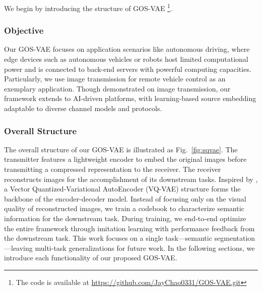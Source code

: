 
%
We begin by introducing the structure of GOS-VAE \footnote{The code is available at \url{https://github.com/JayChao0331/GOS-VAE.git}}.


\subsubsection{Objective}
Our GOS-VAE focuses on application scenarios like autonomous driving, where edge devices such as autonomous vehicles or robots host limited computational power and is connected
to back-end servers with powerful computing capacities. Particularly, we use image transmission for remote vehicle control as an exemplary application. Though demonstrated on image transmission, our framework extends to AI-driven platforms, with learning-based source embedding adaptable to diverse channel models and protocols.

\subsubsection{Overall Structure}
The overall structure of our GOS-VAE is illustrated as Fig.~\ref{fig:sqvae}.
The transmitter features a lightweight encoder to embed the original images before transmitting a compressed representation to the receiver. The receiver reconstructs images for the accomplishment of its downstream tasks. Inspired by \cite{fu2023vector}, a Vector Quantized-Variational AutoEncoder (VQ-VAE) \cite{van2017neural} structure forms the backbone of the encoder-decoder model. Instead of focusing only on the visual quality of reconstructed images, we train a codebook to characterize
semantic information for the downstream task. During training, we end-to-end optimize the entire framework through imitation learning with performance feedback from the downstream task. %
This work focuses on a single task—semantic segmentation—leaving multi-task generalizations for future work. In the following sections, we introduce each functionality of our proposed GOS-VAE.



